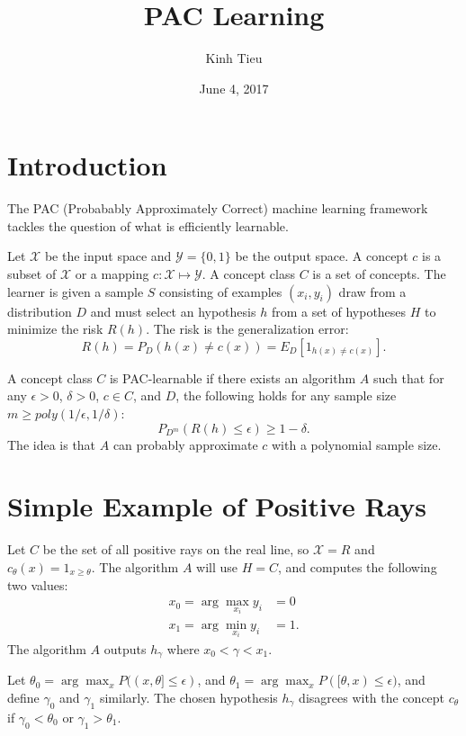 \documentclass{article}
\begin{document}
\title{PAC Learning}
\author{Kinh Tieu}
\date{June 4, 2017}
\maketitle

\section{Introduction}

The PAC (Probabably Approximately Correct) machine learning framework tackles the question of what is efficiently learnable.

Let $\mathcal{X}$ be the input space and $\mathcal{Y} = \{0, 1\}$ be the output space.  A concept $c$ is a subset of $\mathcal{X}$ or a mapping $c: \mathcal{X} \mapsto \mathcal{Y}$.  A concept class $C$ is a set of concepts.  The learner is given a sample $S$ consisting of examples $(x_i, y_i)$ draw from a distribution $D$ and must select an hypothesis $h$ from a set of hypotheses $H$ to minimize the risk $R(h)$.  The risk is the generalization error:
$$ R(h) = P_D(h(x) \ne c(x)) = E_D[1_{h(x) \ne c(x)}]. $$

A concept class $C$ is PAC-learnable if there exists an algorithm $A$ such that for any $\epsilon > 0$, $\delta > 0$, $c \in C$, and $D$, the following holds for any sample size $m \ge poly(1/\epsilon, 1/\delta)$:
$$ P_{D^m}(R(h) \le \epsilon) \ge 1 - \delta. $$
The idea is that $A$ can probably approximate $c$ with a polynomial sample size.

\section{Simple Example of Positive Rays}

Let $C$ be the set of all positive rays on the real line, so $\mathcal{X} = R$ and $c_\theta(x) = 1_{x \ge \theta}$.  The algorithm $A$ will use $H = C$, and computes the following two values:
\begin{align*}
x_0 = \arg \max_{x_i} y_i &= 0 \\
x_1 = \arg \min_{x_i} y_i &= 1.
\end{align*}
The algorithm $A$ outputs $h_\gamma$ where $x_0 < \gamma < x_1$.

Let $\theta_0 = \arg \max_x P((x, \theta] \le \epsilon)$, and $\theta_1 = \arg \max_x P([\theta, x) \le \epsilon)$, and define $\gamma_0$ and $\gamma_1$ similarly.  The chosen hypothesis $h_\gamma$ disagrees with the concept $c_\theta$ if $\gamma_0 < \theta_0$ or $\gamma_1 > \theta_1$.

\end{document}
